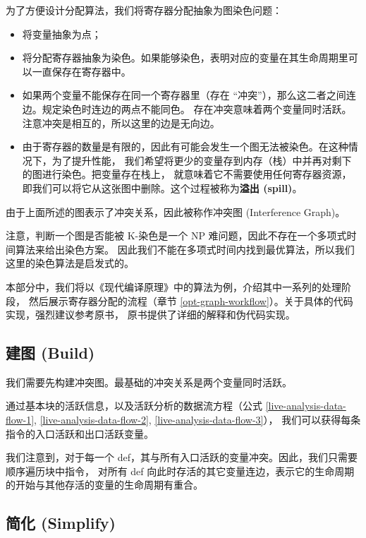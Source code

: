 为了方便设计分配算法，我们将寄存器分配抽象为图染色问题：
\begin{itemize}
    \item 将变量抽象为点；
    \item 将分配寄存器抽象为染色。如果能够染色，表明对应的变量在其生命周期里可以一直保存在寄存器中。
    \item 如果两个变量不能保存在同一个寄存器里（存在 “冲突”），那么这二者之间连边。规定染色时连边的两点不能同色。
        存在冲突意味着两个变量同时活跃。注意冲突是相互的，所以这里的边是无向边。
    \item 由于寄存器的数量是有限的，因此有可能会发生一个图无法被染色。在这种情况下，为了提升性能，
        我们希望将更少的变量存到内存（栈）中并再对剩下的图进行染色。把变量存在栈上，
        就意味着它不需要使用任何寄存器资源，即我们可以将它从这张图中删除。这个过程被称为\textbf{溢出 (spill)}。
\end{itemize}

由于上面所述的图表示了冲突关系，因此被称作冲突图 (Interference Graph)。

注意，判断一个图是否能被 K-染色是一个 NP 难问题，因此不存在一个多项式时间算法来给出染色方案。
因此我们不能在多项式时间内找到最优算法，所以我们这里的染色算法是启发式的。

本部分中，我们将以《现代编译原理》\cite{TigerBook}中的算法为例，介绍其中一系列的处理阶段，
然后展示寄存器分配的流程（章节 \ref{opt-graph-workflow}）。关于具体的代码实现，强烈建议参考原书，
原书提供了详细的解释和伪代码实现。

\subsection{建图 (Build)} \label{opt-graph-build}

我们需要先构建冲突图。最基础的冲突关系是两个变量同时活跃。

通过基本块的活跃信息，以及活跃分析的数据流方程（公式 \ref{live-analysis-data-flow-1},
\ref{live-analysis-data-flow-2}, \ref{live-analysis-data-flow-3}），
我们可以获得每条指令的入口活跃和出口活跃变量。

我们注意到，对于每一个 def，其与所有入口活跃的变量冲突。因此，我们只需要顺序遍历块中指令，
对所有 def 向此时存活的其它变量连边，表示它的生命周期的开始与其他存活的变量的生命周期有重合。

\subsection{简化 (Simplify)} \label{opt-graph-simplify}

